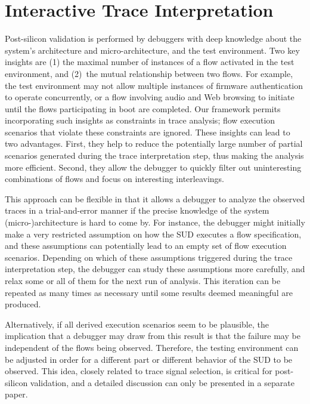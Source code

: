 \documentclass[12pt,frontmatter,copyright,thesis]{usfmanus}
\begin{document}
\section{Interactive Trace Interpretation}

Post-silicon validation is performed by debuggers with deep
knowledge about the system's architecture and
micro-architecture, and the test environment.  Two key
insights are (1) the maximal number of instances of a flow
activated in the test environment, and (2)~the mutual
relationship between two flows.  For example, the test
environment may not allow multiple instances of firmware
authentication to operate concurrently, or a flow involving
audio and Web browsing to initiate until the flows
participating in boot are completed.  Our framework permits
incorporating such insights as constraints in trace
analysis; flow execution scenarios that violate these
constraints are ignored.  These insights can lead to two
advantages.  First, they help to reduce the potentially
large number of partial scenarios generated during the trace
interpretation step, thus making the analysis more
efficient.  Second, they allow the debugger to quickly
filter out uninteresting combinations of flows and focus on
interesting interleavings.

This approach can be flexible in that it allows a debugger
to analyze the observed traces in a trial-and-error manner
if the precise knowledge of the system (micro-)architecture
is hard to come by.  For instance, the debugger might
initially make a very restricted assumption on how the SUD
executes a flow specification, and these assumptions can
potentially lead to an empty set of flow execution
scenarios.  Depending on which of these assumptions
triggered during the trace interpretation step, the debugger
can study these assumptions more carefully, and relax some
or all of them for the next run of analysis.  This iteration
can be repeated as many times as necessary until some
results deemed meaningful are produced.


 Alternatively, if all derived execution scenarios seem to be
 plausible, the implication that a debugger may draw from
 this result is that the failure may be independent of the
 flows being observed.  Therefore, the testing environment
 can be adjusted in order for a different part or different
 behavior of the SUD to be observed.  This idea, closely
 related to trace signal selection, is critical for
 post-silicon validation, and a detailed discussion can only
 be presented in a separate paper.
\end{document}
